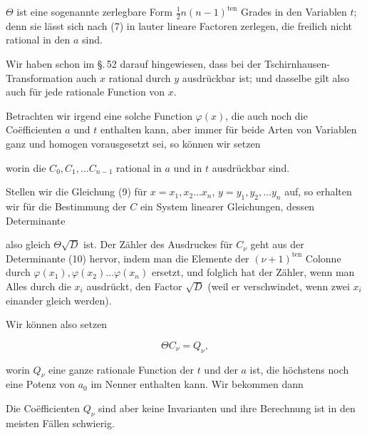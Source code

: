 
$\Theta$ ist eine sogenannte zerlegbare Form $\frac{1}{2}n(n-1)^{\mathrm{ten}}$ Grades in den Variablen $t$; denn sie lässt sich nach (7) in lauter lineare Factoren zerlegen, die freilich nicht rational in den $a$ sind.

Wir haben schon im \S.\,52 darauf hingewiesen, dass bei der Tschirnhausen-Transformation auch $x$ rational durch $y$ ausdrückbar ist; und dasselbe gilt also auch für jede rationale Function von $x$.

Betrachten wir irgend eine solche Function $\varphi(x)$, die auch noch die Coëfficienten $a$ und $t$ enthalten kann, aber immer für beide Arten von Variablen ganz und homogen vorausgesetzt sei, so können wir setzen


worin die $C_0, C_1, \ldots C_{n-1}$ rational in $a$ und in $t$ ausdrückbar sind.

Stellen wir die Gleichung (9) für $x=x_1,x_2\ldots x_n$, $y=y_1,y_2,\ldots y_n$ auf, so erhalten wir für die Bestimmung der $C$ ein System linearer Gleichungen, dessen Determinante


also gleich $\Theta\sqrt{D}$ ist. Der Zähler des Ausdruckes für $C_\nu$ geht aus der Determinante (10) hervor, indem man die Elemente der $(\nu+1)^{\mathrm{ten}}$ Colonne durch $\varphi(x_1), \varphi(x_2)\ldots\varphi(x_n)$ ersetzt, und folglich hat der Zähler, wenn man Alles durch die $x_i$ ausdrückt, den Factor $\sqrt{D}$ (weil er verschwindet, wenn zwei $x_i$ einander gleich werden).

Wir können also setzen

\[ \Theta C_\nu = Q_\nu, \]

worin $Q_\nu$ eine ganze rationale Function der $t$ und der $a$ ist, die höchstens noch eine Potenz von $a_0$ im Nenner enthalten kann. Wir bekommen dann


Die Coëfficienten $Q_\nu$ sind aber keine Invarianten und ihre Berechnung ist in den meisten Fällen schwierig.
